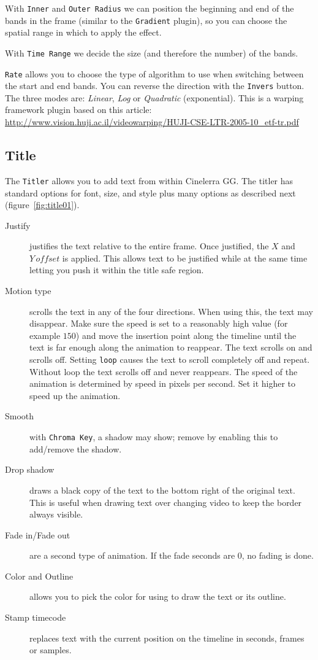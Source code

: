 With \texttt{Inner} and \texttt{Outer Radius} we can position the beginning and end of the bands in the frame (similar to the \texttt{Gradient} plugin), so you can choose the spatial range in which to apply the effect.

With \texttt{Time Range} we decide the size (and therefore the number) of the bands.

\texttt{Rate} allows you to choose the type of algorithm to use when switching between the start and end bands. You can reverse the direction with the \texttt{Invers} button. The three modes are: \textit{Linear}, \textit{Log} or \textit{Quadratic} (exponential). This is a warping framework plugin based on this article: \url{http://www.vision.huji.ac.il/videowarping/HUJI-CSE-LTR-2005-10_etf-tr.pdf}

\subsection{Title}%
\label{sub:title}

The \texttt{Titler} allows you to add text from within Cinelerra GG. The titler has standard options for font, size, and style plus many options as described next (figure~\ref{fig:title01}).

\begin{description}
    \item[Justify] justifies the text relative to the entire frame. Once justified, the $X$ and $Y\, offset$ is applied. This allows text to be justified while at the same time letting you push it within the title safe region.
    \item[Motion type] scrolls the text in any of the four directions. When using this, the text may disappear. Make sure the speed is set to a reasonably high value (for example $150$) and move the insertion point along the timeline until the text is far enough along the animation to reappear. The text scrolls on and scrolls off. Setting \texttt{loop} causes the text to scroll completely off and repeat. Without loop the text scrolls off and never reappears. The speed of the animation is determined by speed in pixels per second. Set it higher to speed up the animation.
    \item[Smooth] with \texttt{Chroma Key}, a shadow may show; remove by enabling this to add/remove the shadow.
    \item[Drop shadow] draws a black copy of the text to the bottom right of the original text. This is useful when drawing text over changing video to keep the border always visible.
    \item[Fade in/Fade out] are a second type of animation. If the fade seconds are $0$, no fading is done.
    \item[Color and Outline] allows you to pick the color for using to draw the text or its outline.
    \item[Stamp timecode] replaces text with the current position on the timeline in seconds, frames or samples.
\end{description}


